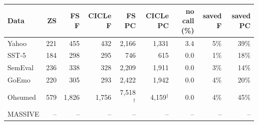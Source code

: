 \begin{tabular}{lrrrrrrrr}
\toprule
Data & ZS & FS F & CICLe F & FS PC & CICLe PC & no call (\%) & saved F & saved PC \\
\midrule
Yahoo & 221 & 455 & 432 & 2,166 & 1,331 & 3.4 & 5\% & 39\% \\
SST-5 & 184 & 298 & 295 & 746 & 615 & 0.0 & 1\% & 18\% \\
SemEval & 236 & 338 & 328 & 2,209 & 1,911 & 0.0 & 3\% & 14\% \\
GoEmo & 220 & 305 & 293 & 2,422 & 1,942 & 0.0 & 4\% & 20\% \\
Ohsumed & 579 & 1,826 & 1,756 & 7,518$^{\dagger}$ & 4,159$^{\dagger}$ & 0.0 & 4\% & 45\% \\
MASSIVE & -- & -- & -- & -- & -- & -- & -- & -- \\
\bottomrule
\end{tabular}
